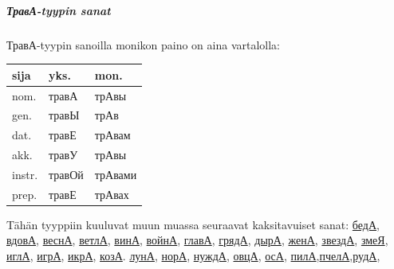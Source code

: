 \documentclass[]{scrartcl}
\begin{document}
\subparagraph{ТравА-tyypin
sanat}\label{ux442ux440ux430ux432ux430-tyypin-sanat}

ТравА-tyypin sanoilla monikon paino on aina vartalolla:

\begin{longtable}[c]{@{}lll@{}}
\toprule
sija & yks. & mon.\tabularnewline
\midrule
\endhead
nom. & травА & трАвы\tabularnewline
gen. & травЫ & трАв\tabularnewline
dat. & травЕ & трАвам\tabularnewline
akk. & травУ & трАвы\tabularnewline
instr. & травОй & трАвами\tabularnewline
prep. & травЕ & трАвах\tabularnewline
\bottomrule
\end{longtable}

Tähän tyyppiin kuuluvat muun muassa seuraavat kaksitavuiset sanat:
\href{http://ru.wiktionary.org/wiki/\%D0\%B1\%D0\%B5\%D0\%B4\%D0\%B0}{бедА},
\href{http://ru.wiktionary.org/wiki/\%D0\%B2\%D0\%B4\%D0\%BE\%D0\%B2\%D0\%B0}{вдовА},
\href{http://ru.wiktionary.org/wiki/\%D0\%B2\%D0\%B5\%D1\%81\%D0\%BD\%D0\%B0}{веснА},
\href{http://ru.wiktionary.org/wiki/\%D0\%B2\%D0\%B5\%D1\%82\%D0\%BB\%D0\%B0}{ветлА},
\href{http://ru.wiktionary.org/wiki/\%D0\%B2\%D0\%B8\%D0\%BD\%D0\%B0}{винА},
\href{http://ru.wiktionary.org/wiki/\%D0\%B2\%D0\%BE\%D0\%B9\%D0\%BD\%D0\%B0}{войнА},
\href{http://ru.wiktionary.org/wiki/\%D0\%B3\%D0\%BB\%D0\%B0\%D0\%B2\%D0\%B0}{главА},
\href{http://ru.wiktionary.org/wiki/\%D0\%B3\%D1\%80\%D1\%8F\%D0\%B4\%D0\%B0}{грядА},
\href{http://ru.wiktionary.org/wiki/\%D0\%B4\%D1\%8B\%D1\%80\%D0\%B0}{дырА},
\href{http://ru.wiktionary.org/wiki/\%D0\%B6\%D0\%B5\%D0\%BD\%D0\%B0}{женА},
\href{http://ru.wiktionary.org/wiki/\%D0\%B7\%D0\%B2\%D0\%B5\%D0\%B7\%D0\%B4\%D0\%B0}{звездА},
\href{http://ru.wiktionary.org/wiki/\%D0\%B7\%D0\%BC\%D0\%B5\%D1\%8F}{змеЯ},
\href{http://ru.wiktionary.org/wiki/\%D0\%B8\%D0\%B3\%D0\%BB\%D0\%B0}{иглА},
\href{http://ru.wiktionary.org/wiki/\%D0\%B8\%D0\%B3\%D1\%80\%D0\%B0}{игрА},
\href{http://ru.wiktionary.org/wiki/\%D0\%B8\%D0\%BA\%D1\%80\%D0\%B0}{икрА},
\href{http://ru.wiktionary.org/wiki/\%D0\%BA\%D0\%BE\%D0\%B7\%D0\%B0}{козА}.
\href{http://ru.wiktionary.org/wiki/\%D0\%BB\%D1\%83\%D0\%BD\%D0\%B0}{лунА},
\href{http://ru.wiktionary.org/wiki/\%D0\%BD\%D0\%BE\%D1\%80\%D0\%B0}{норА},
\href{http://ru.wiktionary.org/wiki/\%D0\%BD\%D1\%83\%D0\%B6\%D0\%B4\%D0\%B0}{нуждА},
\href{http://ru.wiktionary.org/wiki/\%D0\%BE\%D0\%B2\%D1\%86\%D0\%B0}{овцА},
\href{http://ru.wiktionary.org/wiki/\%D0\%BE\%D1\%81\%D0\%B0}{осА},
\href{http://ru.wiktionary.org/wiki/\%D0\%BF\%D0\%B8\%D0\%BB\%D0\%B0}{пилА},\href{http://ru.wiktionary.org/wiki/\%D0\%BF\%D1\%87\%D0\%B5\%D0\%BB\%D0\%B0}{пчелА},\href{http://ru.wiktionary.org/wiki/\%D1\%80\%D1\%83\%D0\%B4\%D0\%B0}{рудА},
\end{document}
